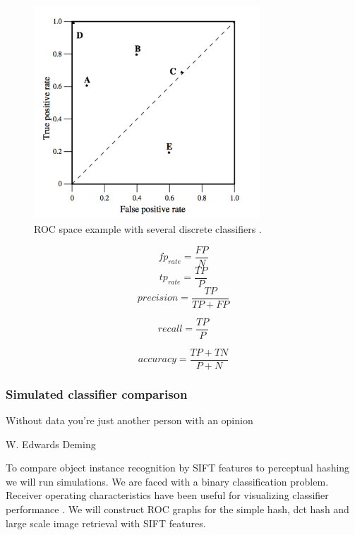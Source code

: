 \documentclass[english,12pt,a4paper,pdftex,elec,utf8]{aaltothesis}
\begin{document}
\begin{figure}[htb]
\begin{center}
\includegraphics[height=8cm]{figures/ROC}
\end{center}
\caption{ROC space example with several discrete classifiers \cite{Fawcett2006}. }
\label{figrocspace}
\end{figure}


\begin{equation}
fp_{rate} = \frac{FP}{N}
\end{equation}
\begin{equation}
tp_{rate} = \frac{TP}{P}
\end{equation}
\begin{equation}
precision = \frac{TP}{TP + FP}
\end{equation}

\begin{equation}
recall = \frac{TP}{P}
\end{equation}

\begin{equation}
accuracy = \frac{TP + TN}{P + N}
\end{equation}

\subsubsection{Simulated classifier comparison}
\epigraph{Without data you're just another person with an opinion}{W. Edwards Deming}

To compare object instance recognition by SIFT features to perceptual hashing we will run simulations. We are faced with a binary classification problem. Receiver operating characteristics have been useful for visualizing classifier performance \cite{Fawcett2006}. We will construct ROC graphs for the simple hash, dct hash and large scale image retrieval with SIFT features.
\end{document}

